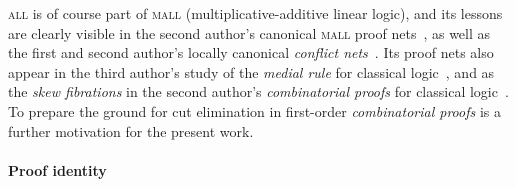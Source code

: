 \documentclass[UKenglish]{lipics-v2019}
\newcommand\all{\textsc{all}}
\newcommand\mall{\textsc{mall}}
\newcommand\+{+}
\renewcommand\*{\times}
\begin{document}
{\all} is of course part of {\mall} (multiplicative-additive linear logic), and its lessons are clearly visible in the second author's canonical {\mall} proof nets~\cite{Hughes-vanGlabbeek-2005}, as well as the first and second author's locally canonical \emph{conflict nets}~\cite{Hughes-Heijltjes-2016}. Its proof nets also appear in the third author's study of the \emph{medial rule} for classical logic~\cite{str:RTA07}, and as the \emph{skew fibrations} in the second author's \emph{combinatorial proofs} for classical logic~\cite{Hughes-2006-proofs}. To prepare the ground for cut elimination in first-order \emph{combinatorial proofs} is a further motivation for the present work.

\paragraph*{Proof identity}
\end{document}
